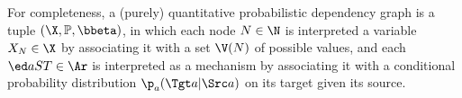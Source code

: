 {{For completeness, a (purely) quantitative probabilistic
dependency graph is a tuple $(\X, \mathbb P, \bbeta)$,
in which each node $N \in \N$ is interpreted a variable $X_N \in \X$
by associating it with a set $\V(N)$ of possible values,
and each \arc\ $\ed aST \in \Ar$ is 
    interpreted as a mechanism by associating it
with a conditional probability distribution
$\p_a(\Tgt a | \Src a)$ on its target given its source.
}
%

}
